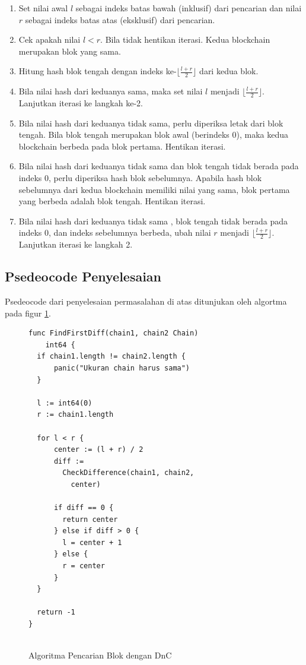 \documentclass[10pt,conference]{IEEEtran}
\theoremstyle{definition}
\begin{document}
\begin{enumerate}
    \item Set nilai awal $l$ sebagai indeks batas bawah (inklusif) dari pencarian dan nilai $r$ sebagai indeks batas atas (eksklusif) dari pencarian.
    \item Cek apakah nilai $l < r$. Bila tidak hentikan iterasi. Kedua blockchain merupakan blok yang sama.
    \item Hitung hash blok tengah dengan indeks ke-$\lfloor \frac{l+r}{2} \rfloor$ dari kedua blok.
    \item Bila nilai hash dari keduanya sama, maka set nilai $l$ menjadi $\lfloor \frac{l+r}{2} \rfloor$. Lanjutkan iterasi ke langkah ke-2.
    \item Bila nilai hash dari keduanya tidak sama, perlu diperiksa letak dari blok tengah. Bila blok tengah merupakan blok awal (berindeks 0), maka kedua blockchain berbeda pada blok pertama. Hentikan iterasi.
    \item Bila nilai hash dari keduanya tidak sama dan blok tengah tidak berada pada indeks 0, perlu diperiksa hash blok sebelumnya. Apabila hash blok sebelumnya dari kedua blockchain memiliki nilai yang sama, blok pertama yang berbeda adalah blok tengah. Hentikan iterasi.
    \item Bila nilai hash dari keduanya tidak sama , blok tengah tidak berada pada indeks 0, dan indeks sebelumnya berbeda, ubah nilai $r$ menjadi $\lfloor \frac{l+r}{2} \rfloor$. Lanjutkan iterasi ke langkah 2.
\end{enumerate}

\subsection{Psedeocode Penyelesaian}
Psedeocode dari penyelesaian permasalahan di atas ditunjukan oleh algortma pada figur \ref{algo:1}.


\begin{figure}
    \begin{verbatim}
func FindFirstDiff(chain1, chain2 Chain) 
    int64 {
  if chain1.length != chain2.length {
      panic("Ukuran chain harus sama")
  }
  
  l := int64(0)
  r := chain1.length
  
  for l < r {
      center := (l + r) / 2
      diff := 
        CheckDifference(chain1, chain2, 
          center)
  
      if diff == 0 {
        return center
      } else if diff > 0 {
        l = center + 1
      } else {
        r = center
      }
  }
  
  return -1
}
        
    \end{verbatim}
    \caption{Algoritma Pencarian Blok dengan DnC}
    \label{algo:1} 
\end{figure}
\end{document}
